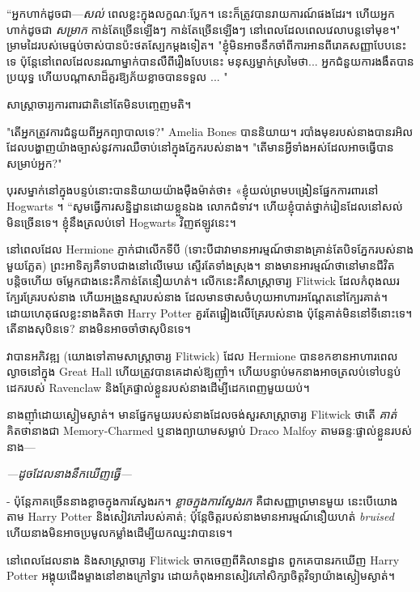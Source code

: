 {“អ្នកហាក់ដូចជា—\emph{សល់} ពេលខ្លះក្នុងលក្ខណៈប្លែក។ នេះក៏ត្រូវបានរាយការណ៍ផងដែរ។ ហើយអ្នកហាក់ដូចជា \emph{សម្រាក} កាន់តែច្រើនឡើងៗ កាន់តែច្រើនឡើងៗ នៅពេលដែលពេលវេលាបន្តទៅមុខ។" ម្រាមដៃរបស់មេធ្មប់ចាស់បានប៉ះថតស្បែកម្តងទៀត។ "ខ្ញុំមិនអាចនឹកចាំពីការអានពីរោគសញ្ញាបែបនេះទេ ប៉ុន្តែនៅពេលដែលនរណាម្នាក់បានលឺពីរឿងបែបនេះ មនុស្សម្នាក់ស្រមៃថា... អ្នកជំនួយការងងឹតបានប្រយុទ្ធ ហើយបណ្តាសាដ៏គួរឱ្យភ័យខ្លាចបានទទួល ... "

សាស្ត្រាចារ្យ​ការពារ​ជាតិ​នៅ​តែ​មិន​បញ្ចេញ​មតិ។

"តើអ្នកត្រូវការជំនួយពីអ្នកព្យាបាលទេ?" Amelia Bones បាននិយាយ។ របាំងមុខរបស់នាងបានរអិល ដែលបង្ហាញយ៉ាងច្បាស់នូវការឈឺចាប់នៅក្នុងភ្នែករបស់នាង។ "តើមានអ្វីទាំងអស់ដែលអាចធ្វើបានសម្រាប់អ្នក?"

បុរស​ម្នាក់​នៅ​ក្នុង​បន្ទប់​នោះ​បាន​និយាយ​យ៉ាង​ម៉ឺងម៉ាត់​ថា​៖ «​ខ្ញុំ​យល់ព្រម​បង្រៀន​ផ្នែក​ការពារ​នៅ​ Hogwarts ។ “សូមធ្វើការសន្និដ្ឋានដោយខ្លួនឯង លោកជំទាវ។ ហើយ​ខ្ញុំ​បាត់​ថ្នាក់​រៀន​ដែល​នៅ​សល់​មិន​ច្រើន​ទេ។ ខ្ញុំនឹងត្រលប់ទៅ Hogwarts វិញឥឡូវនេះ។

\later

នៅពេលដែល Hermione ភ្ញាក់ជាលើកទីបី (ទោះបីជាវាមានអារម្មណ៍ថានាងគ្រាន់តែបិទភ្នែករបស់នាងមួយភ្លែត) ព្រះអាទិត្យគឺទាបជាងនៅលើមេឃ ស្ទើរតែទាំងស្រុង។ នាង​មាន​អារម្មណ៍​ថា​នៅ​មាន​ជីវិត​បន្តិច​ហើយ ចម្លែក​ជាង​នេះ​គឺ​កាន់តែ​នឿយហត់។ លើក​នេះ​គឺ​សាស្ត្រាចារ្យ Flitwick ដែល​កំពុង​ឈរ​ក្បែរ​គ្រែ​របស់​នាង ហើយ​អង្រួន​ស្មា​របស់​នាង ដែល​មាន​ថាស​ចំហុយ​អាហារ​អណ្តែត​នៅ​ក្បែរ​គាត់។ ដោយហេតុផលខ្លះនាងគិតថា Harry Potter គួរតែផ្អៀងលើគ្រែរបស់នាង ប៉ុន្តែគាត់មិននៅទីនោះទេ។ តើនាងសុបិនទេ? នាងមិនអាចចាំថាសុបិនទេ។

វាបានអភិវឌ្ឍ (យោងទៅតាមសាស្រ្តាចារ្យ Flitwick) ដែល Hermione បានខកខានអាហារពេលល្ងាចនៅក្នុង Great Hall ហើយត្រូវបានគេដាស់ឱ្យញ៉ាំ។ ហើយបន្ទាប់មកនាងអាចត្រលប់ទៅបន្ទប់ដេករបស់ Ravenclaw និងគ្រែផ្ទាល់ខ្លួនរបស់នាងដើម្បីដេកពេញមួយយប់។

នាងញ៉ាំដោយស្ងៀមស្ងាត់។ មានផ្នែកមួយរបស់នាងដែលចង់សួរសាស្រ្តាចារ្យ Flitwick ថាតើ \emph{គាត់} គិតថានាងជា Memory-Charmed ឬនាងព្យាយាមសម្លាប់ Draco Malfoy តាមឆន្ទៈផ្ទាល់ខ្លួនរបស់នាង—

\emph{—ដូចដែលនាងនឹកឃើញធ្វើ—}

- ប៉ុន្តែភាគច្រើននាងខ្លាចក្នុងការស្វែងរក។ \emph{ខ្លាចក្នុងការស្វែងរក} គឺជាសញ្ញាព្រមានមួយ នេះបើយោងតាម ​​Harry Potter និងសៀវភៅរបស់គាត់; ប៉ុន្តែចិត្តរបស់នាងមានអារម្មណ៍នឿយហត់ \emph{bruised} ហើយនាងមិនអាចប្រមូលកម្លាំងដើម្បីយកឈ្នះវាបានទេ។

នៅពេលដែលនាង និងសាស្រ្តាចារ្យ Flitwick ចាកចេញពីគិលានដ្ឋាន ពួកគេបានរកឃើញ Harry Potter អង្គុយជើងម្ខាងនៅខាងក្រៅទ្វារ ដោយកំពុងអានសៀវភៅសិក្សាចិត្តវិទ្យាយ៉ាងស្ងៀមស្ងាត់។

}
